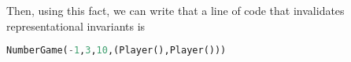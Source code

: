 \documentclass[12pt]{article}
\begin{document}
\begin{enumerate}[1.]
\begin{itemize}
        \bigskip

        Then, using this fact, we can write that a line of code that
        invalidates representational invariants is

        \bigskip

        \begin{lstlisting}[language=Python]
        NumberGame(-1,3,10,(Player(),Player()))
        \end{lstlisting}
















\end{itemize}
\end{enumerate}
\end{document}

